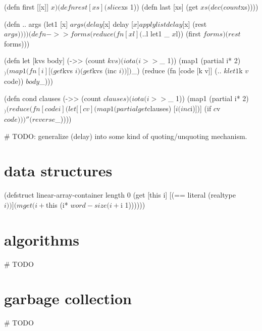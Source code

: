 \documentclass{report}
\begin{document}
\begin{xhcode}
(defn first [[x]] $x)
(defn rest  [xs]  (slice $xs 1))
(defn last  [xs]  (get $xs (dec (count $xs))))

(defn .. args
  (let1 [x] $args
    (delay [$x]
     delay [$x]
     apply list delay [$x] (rest $args))))

(defn ->> forms
  (reduce (fn [x l] (.. $l let1 _ $x $l))
          (first $forms)
          (rest $forms)))

(defn let [kvs body]
  (->> (count $kvs)
       (iota (i>> $_ 1))
       (map1 (partial i* 2) $_)
       (map1 (fn [i] [(get $kvs $i) (get $kvs (inc $i))]) $_)
       (reduce (fn [code [k v]] (.. $k let1 $k $v $code))
               $body
               $_)))

(defn cond clauses
  (->> (count $clauses)
       (iota (i>> $_ 1))
       (map1 (partial i* 2) $_)
       (reduce (fn [code i]
                 (let [[c v] (map1 (partial get $clauses) [$i (inc $i)])]
                   (if $c $v $code)))
               ''
               (reverse $_))))

# TODO: generalize (delay) into some kind of quoting/unquoting mechanism. \end{xhcode}

\chapter{data structures}\label{chp:data-structures}

\begin{xhcode}
(defstruct linear-array-container
  {length 0}
  (get [this i]
    [(== literal (realtype $i))]
    (mget (i+ $this (i* $word-size (i+ $i 1)))))) \end{xhcode}

\chapter{algorithms}\label{chp:algorithms}
\begin{xhcode}
# TODO \end{xhcode}

\chapter{garbage collection}\label{chp:garbage-collection}
\begin{xhcode}
# TODO \end{xhcode}
\end{document}
